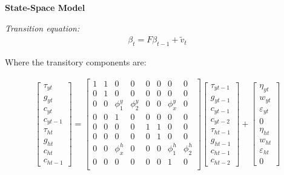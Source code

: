 \documentclass[fleqn]{article}
\begin{document}
\begin{outline}[enumerate]
\textbf{State-Space Model}

\textit{Transition equation:}
\begin{align}
\beta_t = F\beta_{t-1} + \tilde{v}_t
\end{align}

Where the transitory components are:

\begin{align}
\begin{bmatrix}
\tau_{yt}	\\
g_{yt}		\\
c_{yt}		\\
c_{yt-1}	\\
\tau_{ht}	\\
g_{ht}		\\
c_{ht}		\\
c_{ht-1}
\end{bmatrix}
=
\begin{bmatrix}
1	& 1	& 0	& 0	& 0	& 0	& 0 & 0	\\
0	& 1	& 0	& 0	& 0	& 0	& 0 & 0	\\
0	& 0	& \phi^y_{1}	& \phi^y_{2} & 0 & 0 & \phi^y_x &0 \\
0	& 0	& 1	& 0	& 0	& 0	& 0 & 0 \\
0	& 0	& 0	& 0	& 1	& 1	& 0 & 0	\\
0	& 0	& 0	& 0	& 0	& 1	& 0 & 0	\\
0	& 0	& \phi^h_{x}	& 0 & 0 & 0 & \phi^h_1 &\phi^h_2 \\
0	& 0	& 0	& 0	& 0	& 0	& 1 & 0 \\
\end{bmatrix}
\begin{bmatrix}
\tau_{yt-1}	\\
g_{yt-1}		\\
c_{yt-1}		\\
c_{yt-2}	\\
\tau_{ht-1}	\\
g_{ht-1}		\\
c_{ht-1}		\\
c_{ht-2}
\end{bmatrix}
+
\begin{bmatrix}
\eta_{yt}	\\
w_{yt}		\\
\varepsilon_{yt}	\\
0			\\
\eta_{ht}	\\
w_{ht}		\\
\varepsilon_{ht}	\\
0
\end{bmatrix}
\end{align}


\end{outline}
\end{document}
